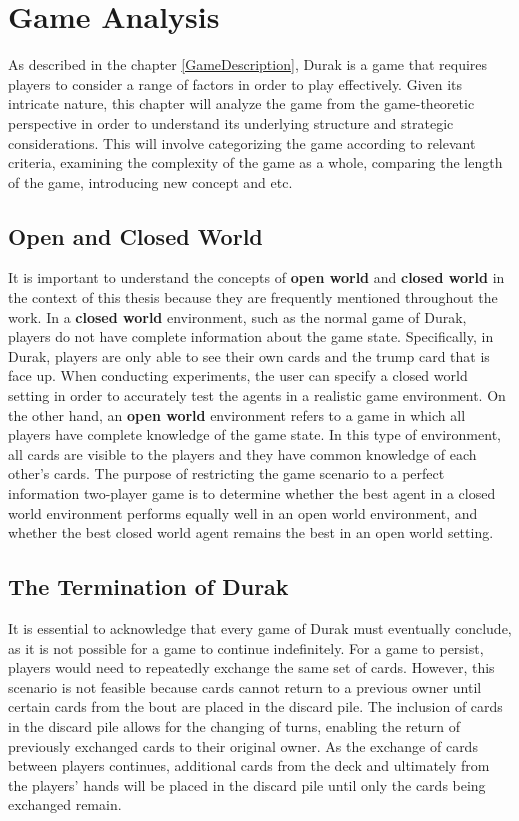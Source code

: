 \chapter{Game Analysis}

As described in the chapter \ref{GameDescription}, Durak is a game that requires players to consider a range of factors in order to play effectively. Given its intricate nature, this chapter will analyze the game from the game-theoretic perspective in order to understand its underlying structure and strategic considerations. This will involve categorizing the game according to relevant criteria, examining the complexity of the game as a whole, comparing the length of the game, introducing new concept and etc.

\section{Open and Closed World}

It is important to understand the concepts of \textbf{open world} and \textbf{closed world} in the context of this thesis because they are frequently mentioned throughout the work. In a \textbf{closed world} environment, such as the normal game of Durak, players do not have complete information about the game state. Specifically, in Durak, players are only able to see their own cards and the trump card that is face up. When conducting experiments, the user can specify a closed world setting in order to accurately test the agents in a realistic game environment. On the other hand, an \textbf{open world} environment refers to a game in which all players have complete knowledge of the game state. In this type of environment, all cards are visible to the players and they have common knowledge of each other's cards. The purpose of restricting the game scenario to a perfect information two-player game is to determine whether the best agent in a closed world environment performs equally well in an open world environment, and whether the best closed world agent remains the best in an open world setting.

\section{The Termination of Durak}
\label{termination}
It is essential to acknowledge that every game of Durak must eventually conclude, as it is not possible for a game to continue indefinitely. For a game to persist, players would need to repeatedly exchange the same set of cards. However, this scenario is not feasible because cards cannot return to a previous owner until certain cards from the bout are placed in the discard pile. The inclusion of cards in the discard pile allows for the changing of turns, enabling the return of previously exchanged cards to their original owner. As the exchange of cards between players continues, additional cards from the deck and ultimately from the players' hands will be placed in the discard pile until only the cards being exchanged remain.

